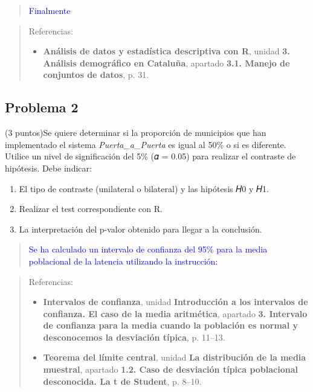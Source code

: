 \documentclass[
]{article}
\providecommand{\tightlist}{%
  \setlength{\itemsep}{0pt}\setlength{\parskip}{0pt}}
\begin{document}
\begin{quote}
\textcolor{blue}{ 
Finalmente
}
\end{quote}

\begin{quote}
Referencias:
\begin{itemize}
\item \textbf{Análisis de datos y estadística descriptiva con R}, unidad \textbf{3. Análisis demográfico en Cataluña}, apartado \textbf{3.1. Manejo de conjuntos de datos}, p. 31.
\end{itemize}
\end{quote}

\subsection{Problema 2}\label{problema-2}

(3 puntos)Se quiere determinar si la proporción de municipios que han
implementado el sistema \emph{Puerta\_a\_Puerta} es igual al 50\% o si
es diferente. Utilice un nivel de significación del 5\% (𝛼 = 0.05) para
realizar el contraste de hipótesis. Debe indicar:

\begin{enumerate}
\def\labelenumi{\arabic{enumi}.}
\tightlist
\item
  El tipo de contraste (unilateral o bilateral) y las hipótesis 𝐻0 y 𝐻1.
\item
  Realizar el test correspondiente con R.
\item
  La interpretación del p-valor obtenido para llegar a la conclusión.
\end{enumerate}

\begin{quote}
\textcolor{blue}{
Se ha calculado un intervalo de confianza del 95\% para la media poblacional de la latencia utilizando la instrucción:
}
\end{quote}

\begin{quote}
Referencias:
\begin{itemize}
\item \textbf{Intervalos de confianza}, unidad \textbf{Introducción a los intervalos de confianza. El caso de la media aritmética}, apartado \textbf{3. Intervalo de confianza para la media cuando la población es normal y desconocemos la desviación típica}, p. 11--13.
\item \textbf{Teorema del límite central}, unidad \textbf{La distribución de la media muestral}, apartado \textbf{1.2. Caso de desviación típica poblacional desconocida. La t de Student}, p. 8--10.
\end{itemize}
\end{quote}
\end{document}

